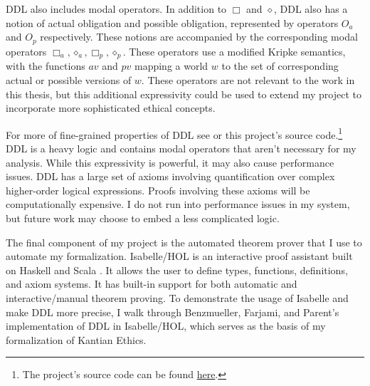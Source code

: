 \begin{isabellebody}
\begin{isamarkuptext}
DDL also includes modal operators. In addition to $\Box$ and $\diamond$, DDL also has a notion
of actual obligation and possible obligation, represented by operators $O_a$ and $O_p$ respectively. 
These notions are accompanied by the corresponding modal operators $\Box_a, \diamond_a, \Box_p, \diamond_p$. 
These operators use a modified Kripke semantics, with the functions $av$ and $pv$ mapping a world $w$ to the set 
of corresponding actual or possible versions of $w$. These operators are not relevant to the work in 
this thesis, but this additional expressivity could be used to extend my project to incorporate 
more sophisticated ethical concepts.

For more of fine-grained properties of DDL see \citet{CJDDL} or this project's source code.\footnote{The
project's source code can be found \href{https://github.com/lsingh123/cs91r}{here}.} DDL is a heavy logic and contains modal operators 
that aren't necessary for my analysis. While this expressivity is powerful, it may also cause performance
issues. DDL has a large set of axioms involving quantification over complex higher-order
logical expressions. Proofs involving these axioms will be computationally expensive. I do not run 
into performance issues in my system, but future work may choose to embed a less complicated logic.%
\end{isamarkuptext}\isamarkuptrue%
%
\isadelimdocument
%
\endisadelimdocument
%
\isatagdocument
%
\isamarkuptrue%
%
\endisatagdocument
{\isafolddocument}%
%
\isadelimdocument
%
\endisadelimdocument
%
\begin{isamarkuptext}%
The final component of my project is the automated theorem prover that I use to automate my formalization.
Isabelle/HOL is an interactive proof assistant built on Haskell and Scala \citep{isabelle}. It 
allows the user to define types, functions, definitions, and axiom systems. It has built-in support for both
automatic and interactive/manual theorem proving. To demonstrate the usage of Isabelle and 
make DDL more precise, I walk through Benzmueller, Farjami, and Parent's implementation of DDL in Isabelle/HOL, 
which serves as the basis of my formalization of Kantian Ethics.%
\end{isamarkuptext}\isamarkuptrue%
%
\isadelimdocument
%
\endisadelimdocument
%
\isatagdocument
%
\isamarkuptrue%
%
\endisatagdocument
{\isafolddocument}%
%
\isadelimdocument
%
\endisadelimdocument
%
\begin{isamarkuptext}%

\end{isamarkuptext}
\end{isabellebody}
